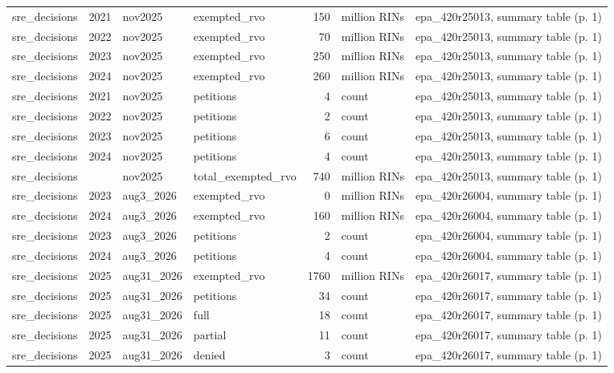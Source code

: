 \begin{longtable}{p{2.3cm}p{0.7cm}p{1.0cm}p{2.6cm}rp{1.7cm}p{4.6cm}}
sre\_decisions & 2021 & nov2025 & exempted\_rvo & 150 & million RINs & epa\_420r25013, summary table (p. 1) \\
sre\_decisions & 2022 & nov2025 & exempted\_rvo & 70 & million RINs & epa\_420r25013, summary table (p. 1) \\
sre\_decisions & 2023 & nov2025 & exempted\_rvo & 250 & million RINs & epa\_420r25013, summary table (p. 1) \\
sre\_decisions & 2024 & nov2025 & exempted\_rvo & 260 & million RINs & epa\_420r25013, summary table (p. 1) \\
sre\_decisions & 2021 & nov2025 & petitions & 4 & count & epa\_420r25013, summary table (p. 1) \\
sre\_decisions & 2022 & nov2025 & petitions & 2 & count & epa\_420r25013, summary table (p. 1) \\
sre\_decisions & 2023 & nov2025 & petitions & 6 & count & epa\_420r25013, summary table (p. 1) \\
sre\_decisions & 2024 & nov2025 & petitions & 4 & count & epa\_420r25013, summary table (p. 1) \\
sre\_decisions &  & nov2025 & total\_exempted\_rvo & 740 & million RINs & epa\_420r25013, summary table (p. 1) \\
sre\_decisions & 2023 & aug3\_2026 & exempted\_rvo & 0 & million RINs & epa\_420r26004, summary table (p. 1) \\
sre\_decisions & 2024 & aug3\_2026 & exempted\_rvo & 160 & million RINs & epa\_420r26004, summary table (p. 1) \\
sre\_decisions & 2023 & aug3\_2026 & petitions & 2 & count & epa\_420r26004, summary table (p. 1) \\
sre\_decisions & 2024 & aug3\_2026 & petitions & 4 & count & epa\_420r26004, summary table (p. 1) \\
sre\_decisions & 2025 & aug31\_2026 & exempted\_rvo & 1760 & million RINs & epa\_420r26017, summary table (p. 1) \\
sre\_decisions & 2025 & aug31\_2026 & petitions & 34 & count & epa\_420r26017, summary table (p. 1) \\
sre\_decisions & 2025 & aug31\_2026 & full & 18 & count & epa\_420r26017, summary table (p. 1) \\
sre\_decisions & 2025 & aug31\_2026 & partial & 11 & count & epa\_420r26017, summary table (p. 1) \\
sre\_decisions & 2025 & aug31\_2026 & denied & 3 & count & epa\_420r26017, summary table (p. 1) \\

\end{longtable}
